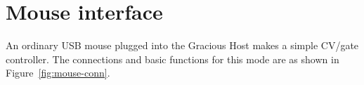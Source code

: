 
%
%
%
%
%
%

\chapter{Mouse interface}

An ordinary USB mouse plugged into the Gracious Host makes a simple CV/gate
controller.  The connections and basic functions for this mode are as shown in
Figure~\ref{fig:mouse-conn}.

